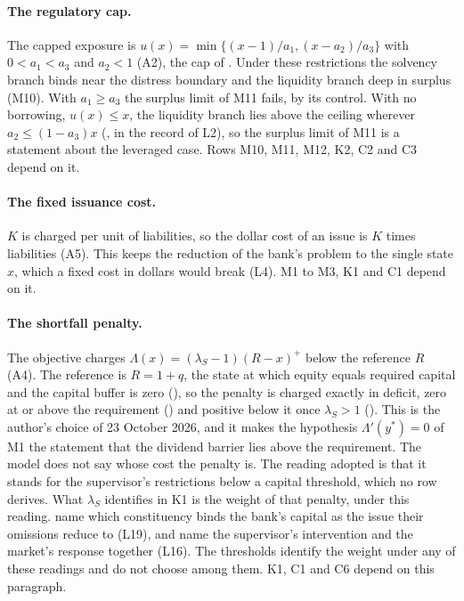 \paragraph{The regulatory cap.} The capped exposure is
$u(x)=\min\{(x-1)/a_1,(x-a_2)/a_3\}$ with $0<a_1<a_3$ and $a_2<1$ (A2), the cap
of \citet{bayraktar2026}. Under these restrictions the solvency branch binds
near the distress boundary and the liquidity branch deep in surplus (M10).
With $a_1\ge a_3$ the surplus limit of M11 fails, by its control. With no
borrowing, $u(x)\le x$, the liquidity branch lies above the ceiling wherever
$a_2\le(1-a_3)x$ (, in the record of L2),
so the surplus limit of M11 is a statement about the leveraged case. Rows M10,
M11, M12, K2, C2 and C3 depend on it.

\paragraph{The fixed issuance cost.} $K$ is charged per unit of liabilities,
so the dollar cost of an issue is $K$ times liabilities (A5). This keeps the
reduction of the bank's problem to the single state $x$, which a fixed cost in
dollars would break (L4). M1 to M3, K1 and C1 depend on it.

\paragraph{The shortfall penalty.} The objective charges
$\Lambda(x)=(\lambda_S-1)(R-x)^+$ below the reference $R$ (A4). The reference
is $R=1+q$, the state at which equity equals required capital and the capital
buffer is zero (), so the penalty is
charged exactly in deficit, zero at or above the requirement
() and positive below it
once $\lambda_S>1$ (). This is
the author's choice of 23 October 2026, and it makes the hypothesis
$\Lambda'(y^*)=0$ of M1 the statement that the dividend barrier lies above the
requirement. The model does not say whose cost the penalty is. The reading adopted is that it stands for
the supervisor's restrictions below a capital threshold, which no row derives.
What $\lambda_S$ identifies in K1 is the weight of that penalty, under this
reading. \citet{peura2006} name which constituency binds the bank's capital
as the issue their omissions reduce to (L19), and \citet{milnewhalley2001}
name the supervisor's intervention and the market's response together (L16).
The thresholds identify the weight under any of these readings and do not
choose among them. K1, C1 and C6 depend on this paragraph.

